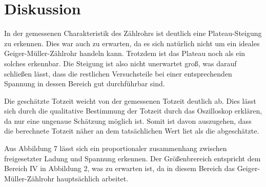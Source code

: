 \section{Diskussion}
\label{sec:Diskussion}

In der gemessenen Charakteristik des Zählrohrs ist deutlich eine Plateau-Steigung zu erkennen. Dies war auch zu
erwarten, da es sich natürlich nicht um ein ideales Geiger-Müller-Zählrohr handeln kann. Trotzdem ist das Plateau
noch als ein solches erkennbar. Die Steigung ist also nicht unerwartet groß, was darauf schließen lässt, dass die
restlichen Versuchsteile bei einer entsprechenden Spannung in dessen Bereich gut durchführbar sind.

Die geschätzte Totzeit weicht von der gemessenen Totzeit deutlich ab. Dies lässt sich durch die qualitative
Bestimmung der Totzeit durch das Oszilloskop erklären, da nur eine ungenaue Schätzung möglich ist. Somit ist
davon auszugehen, dass die berechnete Totzeit näher an dem tatsächlichen Wert liet als die abgeschätzte.


Aus Abbildung 7 lässt sich ein proportionaler zusammenhang zwischen freigesetzter Ladung und Spannung erkennen. Der Größenbrereich entspricht
dem Bereich IV in Abbildung 2, was zu erwarten ist, da in diesem Bereich das Geiger-Müller-Zählrohr hauptsächlich arbeitet.
